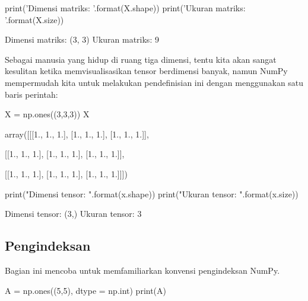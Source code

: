 \begin{pyin}
print('Dimensi matriks: {}'.format(X.shape))
print('Ukuran matriks: {}'.format(X.size))
\end{pyin}

\begin{pyout}
Dimensi matriks: (3, 3)
Ukuran matriks: 9
\end{pyout}

Sebagai manusia yang hidup di ruang tiga dimensi, tentu kita akan sangat kesulitan ketika memvisualisasikan tensor berdimensi banyak, namun NumPy mempermudah kita untuk melakukan pendefinisian ini dengan menggunakan satu baris perintah:
\begin{pyin}
X = np.ones((3,3,3))
X
\end{pyin}
\begin{pyout}
array([[[1., 1., 1.],
        [1., 1., 1.],
        [1., 1., 1.]],

       [[1., 1., 1.],
        [1., 1., 1.],
        [1., 1., 1.]],

       [[1., 1., 1.],
        [1., 1., 1.],
        [1., 1., 1.]]])
\end{pyout}
\begin{pyin}
print("Dimensi tensor: {}".format(x.shape))
print("Ukuran tensor: {}".format(x.size))
\end{pyin}
\begin{pyout}
Dimensi tensor: (3,)
Ukuran tensor: 3
\end{pyout}
\subsection{Pengindeksan}
Bagian ini mencoba untuk memfamiliarkan konvensi pengindeksan NumPy.
\begin{pyin}
A = np.ones((5,5), dtype = np.int)
print(A)
\end{pyin}

